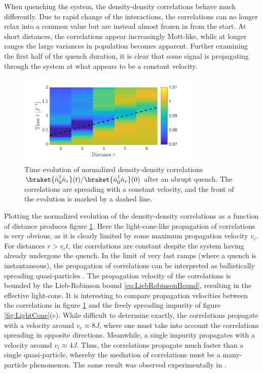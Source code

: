 When quenching the system, the density-density correlations behave much differently. Due to rapid change of the interactions, the correlations can no longer relax into a common value but are instead almost frozen in from the start. At short distances, the correlations appear increasingly Mott-like, while at longer ranges the large variances in population becomes apparent. Further examining the first half of the quench duration, it is clear that some signal is propagating through the system at what appears to be a constant velocity.
\begin{figure}[h!]
    \centering
    \includegraphics[width=0.8\textwidth]{Figures/L20/CorrelationLightCone.pdf}
    \caption{Time evolution of normalized density-density correlations $\braket{\hat{n}_{0}^{\dag} \hat{n}_{r}}(t) / \braket{\hat{n}_{0}^{\dag} \hat{n}_{r}}(0)$ after an abrupt quench. The correlations are spreading with a constant velocity, and the front of the evolution is marked by a dashed line.}
    \label{fig:CorrelationLightCone}
\end{figure}
Plotting the normalized evolution of the density-density correlations as a function of distance produces figure \ref{fig:CorrelationLightCone}. Here the light-cone-like propagation of correlations is very obvious, as it is clearly limited by some maximum propagation velocity $v_c$. For distances $r >  v_c t$, the correlations are constant despite the system having already undergone the quench. In the limit of very fast ramps (where a quench is instantaneous), the propagation of correlations can be interpreted as ballistically spreading quasi-particles \cite{Cheneau2012,Calabrese2006}. The propagation velocity of the correlations is bounded by the Lieb-Robinson bound \eqref{eq:LiebRobinsonBound}, resulting in the effective light-cone. 
It is interesting to compare propagation velocities between the correlations in figure \ref{fig:CorrelationLightCone} and the freely spreading impurity of figure \ref{fig:LightCone}(c). While difficult to determine exactly, the correlations propagate with a velocity around $v_c \approx 8 J$, where one must take into account the correlations spreading in opposite directions. Meanwhile, a single impurity propagates with a velocity around $v_i \approx 4 J$. Thus, the correlations propagate much faster than a single quasi-particle, whereby the mediation of correlations must be a many-particle phenomenon. The same result was observed experimentally in \cite{Cheneau2012}.\\

